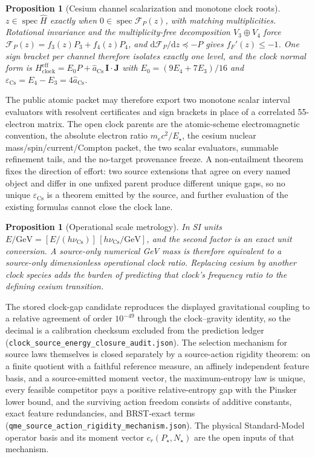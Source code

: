 \documentclass[11pt]{article}
\newtheorem{proposition}[theorem]{Proposition}
\begin{document}
\begin{proposition}[Cesium channel scalarization and monotone clock roots]
\(z\in\operatorname{spec}\widehat H\) exactly when
\(0\in\operatorname{spec}\mathcal F_P(z)\), with matching multiplicities.
Rotational invariance and the multiplicity-free decomposition
\(V_3\oplus V_4\) force \(\mathcal F_P(z)=f_3(z)P_3+f_4(z)P_4\), and
\(\mathrm d\mathcal F_P/\mathrm dz\preceq-P\) gives \(f_F'(z)\le-1\).  One
sign bracket per channel therefore isolates exactly one level, and the clock
normal form is
\(H^{\mathrm{eff}}_{\mathrm{clock}}=E_0P+\widehat a_{\mathrm{Cs}}\,\mathbf I\cdot\mathbf J\)
with \(E_0=(9E_4+7E_3)/16\) and
\(\varepsilon_{\mathrm{Cs}}=E_4-E_3=4\widehat a_{\mathrm{Cs}}\).
\end{proposition}

The public atomic packet may therefore export two monotone scalar interval
evaluators with resolvent certificates and sign brackets in place of a
correlated 55-electron matrix.  The open clock parents are the atomic-scheme
electromagnetic convention, the absolute electron ratio \(m_ec^2/E_\star\),
the cesium nuclear mass/spin/current/Compton packet, the two scalar
evaluators, summable refinement tails, and the no-target provenance freeze.
A non-entailment theorem fixes the direction of effort: two source extensions
that agree on every named object and differ in one unfixed parent
produce different unique gaps, so no unique \(\varepsilon_{\mathrm{Cs}}\) is a
theorem emitted by the source, and further evaluation of the existing
formulas cannot close the clock lane.

\begin{proposition}[Operational scale metrology]
In SI units
\(E/\mathrm{GeV}=[E/(h\nu_{\mathrm{Cs}})]\,[h\nu_{\mathrm{Cs}}/\mathrm{GeV}]\),
and the second factor is an exact unit conversion.  A source-only numerical
GeV mass is therefore equivalent to a source-only dimensionless operational
clock ratio.  Replacing cesium by another clock species adds the burden of
predicting that clock's frequency ratio to the defining cesium transition.
\end{proposition}

The stored clock-gap candidate reproduces the displayed gravitational
coupling to a relative agreement of order \(10^{-49}\) through the
clock--gravity identity, so the decimal is a calibration checksum excluded from the prediction ledger
(\texttt{clock\_source\_energy\_closure\_audit.json}).  The selection
mechanism for source laws themselves is closed separately by a source-action
rigidity theorem: on a finite quotient with a faithful reference measure, an
affinely independent feature basis, and a source-emitted moment vector, the
maximum-entropy law is unique, every feasible competitor pays a positive
relative-entropy gap with the Pinsker lower bound, and the surviving action
freedom consists of additive constants, exact feature redundancies, and
BRST-exact terms
(\texttt{qme\_source\_action\_rigidity\_mechanism.json}).  The physical
Standard-Model operator basis and its moment vector
\(c_r(P_\star,N_\star)\) are the open inputs of that mechanism.
\end{document}
